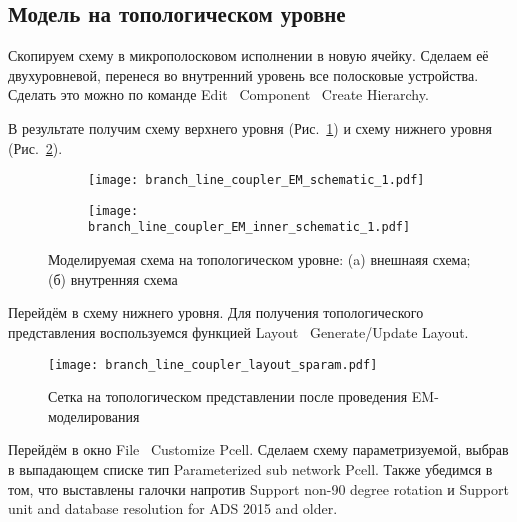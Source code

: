 \subsection{Модель на топологическом уровне}

Скопируем схему в микрополосковом исполнении в новую ячейку. Сделаем её двухуровневой, перенеся во внутренний уровень все полосковые устройства. Сделать это можно по команде Edit \textrightarrow\ Component \textrightarrow\ Create Hierarchy.

В результате получим схему верхнего уровня (Рис.~\ref{fig:branch_line_coupler_EM_schematic}) и схему нижнего уровня (Рис.~\ref{fig:branch_line_coupler_EM_inner_schematic}).

\begin{figure}[!ht]
    \centering
    \begin{subfigure}[b]{0.45\textwidth}
        \centering
        \texttt{[image: branch\_line\_coupler\_EM\_schematic\_1.pdf]}
        \caption{}%
    \label{fig:branch_line_coupler_EM_schematic}
    \end{subfigure}
    \hfill
    \begin{subfigure}[b]{0.45\textwidth}
        \centering
        \texttt{[image: branch\_line\_coupler\_EM\_inner\_schematic\_1.pdf]}
        \caption{}%
    \label{fig:branch_line_coupler_EM_inner_schematic}
    \end{subfigure}
    \caption{%
        Моделируемая схема на топологическом уровне:
        (a) внешнаяя схема;
        (б) внутренняя схема
    }%
    \label{fig:branch_line_coupler_EM_schematics}
\end{figure}

Перейдём в схему нижнего уровня. Для получения топологического представления воспользуемся функцией Layout \textrightarrow\ Generate/Update Layout.

\begin{wrapfigure}{l}{0.4\textwidth}
    \centering
    \texttt{[image: branch\_line\_coupler\_layout\_sparam.pdf]}
    \caption{Сетка на топологическом представлении после проведения EM-моделирования}%
    \label{fig:branch_line_coupler_layout_sparam}
\end{wrapfigure}

Перейдём в окно File \textrightarrow\ Customize Pcell.
Сделаем схему параметризуемой, выбрав в выпадающем списке тип Parameterized sub network Pcell.
Также убедимся в том, что выставлены галочки напротив Support non-90 degree rotation и Support unit and database resolution for ADS 2015 and older.

